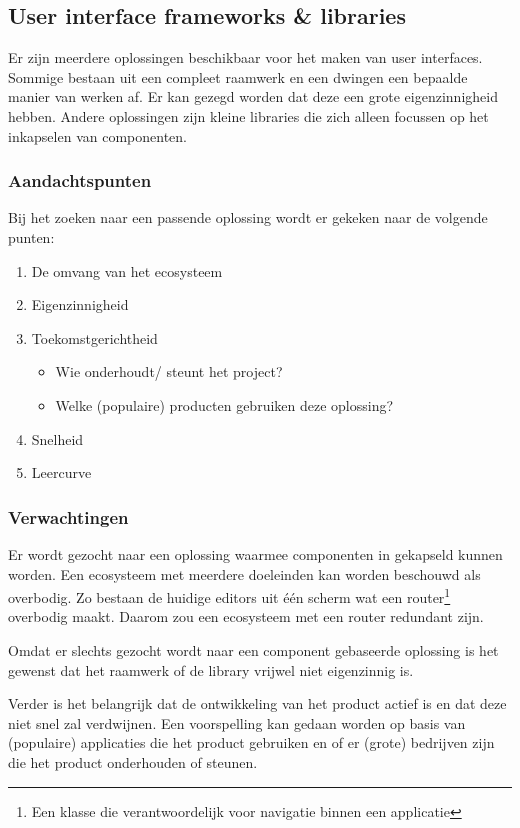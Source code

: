 \clearpage
\subsection{User interface frameworks \& libraries}
Er zijn meerdere oplossingen beschikbaar voor het maken van user interfaces. Sommige bestaan uit een compleet raamwerk en een dwingen een bepaalde manier van werken af. Er kan gezegd worden dat deze een grote eigenzinnigheid hebben. Andere oplossingen zijn kleine libraries die zich alleen focussen op het inkapselen van componenten.

\subsubsection{Aandachtspunten}
Bij het zoeken naar een passende oplossing wordt er gekeken naar de volgende punten:
\begin{enumerate}
    \item De omvang van het ecosysteem
    \item Eigenzinnigheid
    \item Toekomstgerichtheid
    \begin{itemize}
        \item Wie onderhoudt/ steunt het project?
        \item Welke (populaire) producten gebruiken deze oplossing?
    \end{itemize}
    \item Snelheid
    \item Leercurve    
\end{enumerate}

\subsubsection{Verwachtingen}
Er wordt gezocht naar een oplossing waarmee componenten in gekapseld kunnen worden. Een ecosysteem met meerdere doeleinden kan worden beschouwd als overbodig. Zo bestaan de huidige editors uit één scherm wat een router\footnote{Een klasse die verantwoordelijk voor navigatie binnen een applicatie} overbodig maakt. Daarom zou een ecosysteem met een router redundant zijn.

Omdat er slechts gezocht wordt naar een component gebaseerde oplossing is het gewenst dat het raamwerk of de library vrijwel niet eigenzinnig is.

Verder is het belangrijk dat de ontwikkeling van het product actief is en dat deze niet snel zal verdwijnen. Een voorspelling kan gedaan worden op basis van (populaire) applicaties die het product gebruiken en of er (grote) bedrijven zijn die het product onderhouden of steunen.

